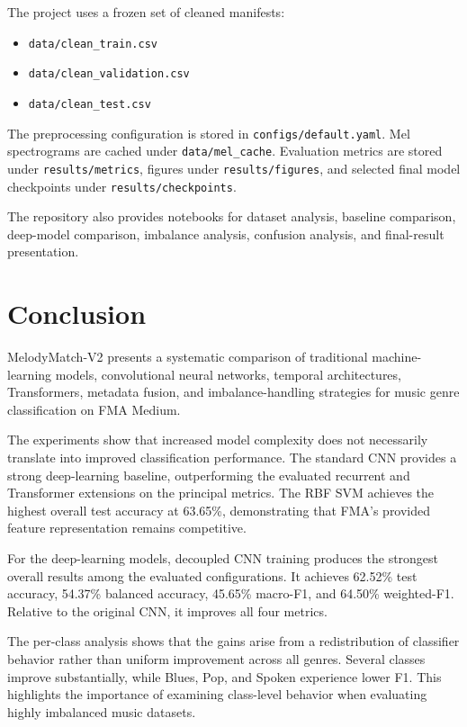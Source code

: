 \documentclass[11pt,a4paper]{article}
\begin{document}
The project uses a frozen set of cleaned manifests:

\begin{itemize}
    \item \texttt{data/clean\_train.csv}
    \item \texttt{data/clean\_validation.csv}
    \item \texttt{data/clean\_test.csv}
\end{itemize}

The preprocessing configuration is stored in \texttt{configs/default.yaml}. Mel spectrograms are cached under \texttt{data/mel\_cache}. Evaluation metrics are stored under \texttt{results/metrics}, figures under \texttt{results/figures}, and selected final model checkpoints under \texttt{results/checkpoints}.

The repository also provides notebooks for dataset analysis, baseline comparison, deep-model comparison, imbalance analysis, confusion analysis, and final-result presentation.

\section{Conclusion}

MelodyMatch-V2 presents a systematic comparison of traditional machine-learning models, convolutional neural networks, temporal architectures, Transformers, metadata fusion, and imbalance-handling strategies for music genre classification on FMA Medium.

The experiments show that increased model complexity does not necessarily translate into improved classification performance. The standard CNN provides a strong deep-learning baseline, outperforming the evaluated recurrent and Transformer extensions on the principal metrics. The RBF SVM achieves the highest overall test accuracy at 63.65\%, demonstrating that FMA's provided feature representation remains competitive.

For the deep-learning models, decoupled CNN training produces the strongest overall results among the evaluated configurations. It achieves 62.52\% test accuracy, 54.37\% balanced accuracy, 45.65\% macro-F1, and 64.50\% weighted-F1. Relative to the original CNN, it improves all four metrics.

The per-class analysis shows that the gains arise from a redistribution of classifier behavior rather than uniform improvement across all genres. Several classes improve substantially, while Blues, Pop, and Spoken experience lower F1. This highlights the importance of examining class-level behavior when evaluating highly imbalanced music datasets.
\end{document}
